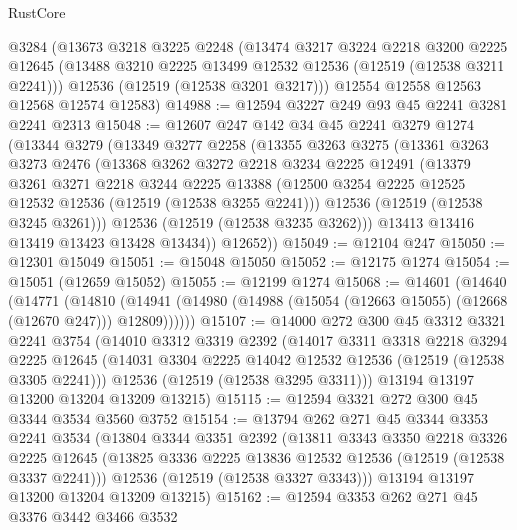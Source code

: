 \begin{lexlean}{RustCore}
\begin{coremodule}
    @3284
    (@13673
      @3218
      @3225
      @2248
      (@13474
        @3217
        @3224
        @2218
        @3200
        @2225
        @12645
        (@13488 @3210 @2225 @13499 @12532 @12536 (@12519 (@12538 @3211 @2241)))
        @12536
        (@12519 (@12538 @3201 @3217)))
      @12554
      @12558
      @12563
      @12568
      @12574
      @12583)
@14988 := @12594 @3227 @249 @93 @45 @2241 @3281 @2241 @2313
@15048 := @12607
    @247
    @142
    @34
    @45
    @2241
    @3279
    @1274
    (@13344
      @3279
      (@13349
        @3277
        @2258
        (@13355
          @3263
          @3275
          (@13361
            @3263
            @3273
            @2476
            (@13368
              @3262
              @3272
              @2218
              @3234
              @2225
              @12491
              (@13379
                @3261
                @3271
                @2218
                @3244
                @2225
                @13388
                (@12500 @3254 @2225 @12525 @12532 @12536 (@12519 (@12538 @3255 @2241)))
                @12536
                (@12519 (@12538 @3245 @3261)))
              @12536
              (@12519 (@12538 @3235 @3262)))
            @13413
            @13416
            @13419
            @13423
            @13428
            @13434))
        @12652))
@15049 := @12104 @247
@15050 := @12301 @15049
@15051 := @15048 @15050
@15052 := @12175 @1274
@15054 := @15051 (@12659 @15052)
@15055 := @12199 @1274
@15068 := @14601
    (@14640
      (@14771
        (@14810 (@14941 (@14980 (@14988 (@15054 (@12663 @15055) (@12668 (@12670 @247))) @12809))))))
@15107 := @14000
    @272
    @300
    @45
    @3312
    @3321
    @2241
    @3754
    (@14010
      @3312
      @3319
      @2392
      (@14017
        @3311
        @3318
        @2218
        @3294
        @2225
        @12645
        (@14031 @3304 @2225 @14042 @12532 @12536 (@12519 (@12538 @3305 @2241)))
        @12536
        (@12519 (@12538 @3295 @3311)))
      @13194
      @13197
      @13200
      @13204
      @13209
      @13215)
@15115 := @12594 @3321 @272 @300 @45 @3344 @3534 @3560 @3752
@15154 := @13794
    @262
    @271
    @45
    @3344
    @3353
    @2241
    @3534
    (@13804
      @3344
      @3351
      @2392
      (@13811
        @3343
        @3350
        @2218
        @3326
        @2225
        @12645
        (@13825 @3336 @2225 @13836 @12532 @12536 (@12519 (@12538 @3337 @2241)))
        @12536
        (@12519 (@12538 @3327 @3343)))
      @13194
      @13197
      @13200
      @13204
      @13209
      @13215)
@15162 := @12594 @3353 @262 @271 @45 @3376 @3442 @3466 @3532

\end{coremodule}
\end{lexlean}
